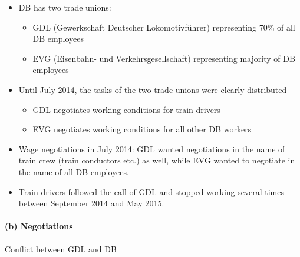 \begin{itemize}
    \item DB has two trade unions:
        \begin{itemize}
            \item GDL (Gewerkschaft Deutscher Lokomotivführer) representing
                70\% of all DB employees
            \item EVG (Eisenbahn- und Verkehrsgesellschaft) representing majority
                of DB employees
        \end{itemize}
    \item Until July 2014, the tasks of the two trade unions were clearly distributed
        \begin{itemize}
            \item GDL negotiates working conditions for train drivers
            \item EVG negotiates working conditions for all other DB workers
        \end{itemize}
    \item Wage negotiations in July 2014: GDL wanted negotiations in the name
        of train crew (train conductors etc.) as well, while EVG wanted to
        negotiate in the name of all DB employees.
    \item Train drivers followed the call of GDL and stopped working several
        times between September 2014 and May 2015.
\end{itemize}

\paragraph{(b) Negotiations}

Conflict between GDL and DB


